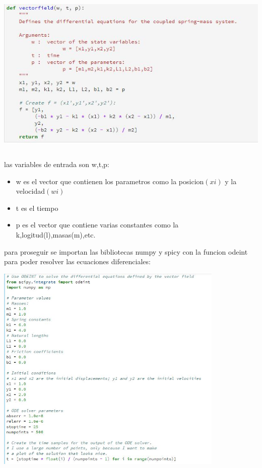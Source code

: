 \documentclass{article}
\begin{document}
\begin{center}
\includegraphics[height=8cm]{cod1.png}
\end{center}

las variables de entrada son w,t,p:
\begin{itemize}
\item w es el vector que contienen los parametros como la  posicion$(xi)$ y la velocidad$(wi)$

\item t es el tiempo
\item p es el vector que contiene varias constantes como la k,logitud(l),masas(m),etc.

\end{itemize}

\vspace{0.5cm}

para proseguir se importan las bibliotecas numpy y spicy con la funcion odeint para poder resolver las ecuaciones diferenciales:

\begin{center}
\includegraphics[height=10cm]{cod2.png}
\end{center}
\end{document}
